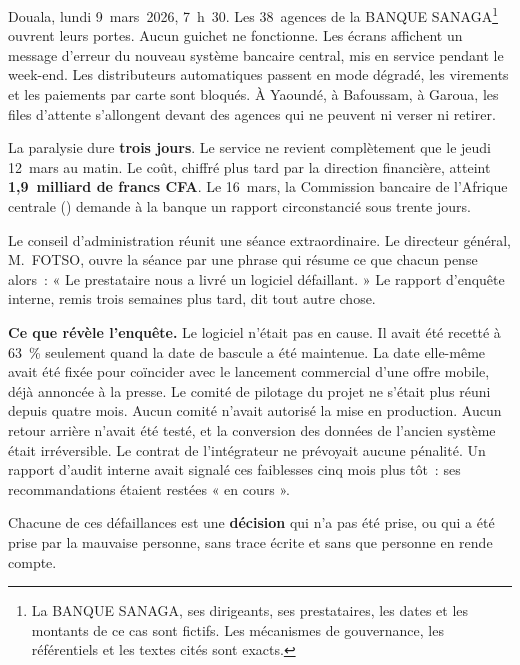 Douala, lundi 9~mars~2026, 7~h~30. Les 38~agences de la BANQUE
SANAGA\footnote{La BANQUE SANAGA, ses dirigeants, ses prestataires, les
dates et les montants de ce cas sont fictifs. Les mécanismes de
gouvernance, les référentiels et les textes cités sont exacts.} ouvrent
leurs portes. Aucun guichet ne fonctionne. Les écrans affichent un message
d'erreur du nouveau système bancaire central, mis en service pendant le
week-end. Les distributeurs automatiques passent en mode dégradé, les
virements et les paiements par carte sont bloqués. À Yaoundé, à Bafoussam,
à Garoua, les files d'attente s'allongent devant des agences qui ne peuvent
ni verser ni retirer.

La paralysie dure \textbf{trois jours}. Le service ne revient complètement
que le jeudi 12~mars au matin. Le coût, chiffré plus tard par la direction
financière, atteint \textbf{1,9~milliard de francs CFA}. Le 16~mars, la
Commission bancaire de l'Afrique centrale () demande à la banque
un rapport circonstancié sous trente jours.

\medskip

Le conseil d'administration réunit une séance extraordinaire. Le directeur
général, M.~FOTSO, ouvre la séance par une phrase qui résume ce que chacun
pense alors~: « Le prestataire nous a livré un logiciel défaillant. » Le
rapport d'enquête interne, remis trois semaines plus tard, dit tout autre
chose.

\begin{boxalert}
\textbf{Ce que révèle l'enquête.} Le logiciel n'était pas en cause. Il
avait été recetté à 63~\% seulement quand la date de bascule a été
maintenue. La date elle-même avait été fixée pour coïncider avec le
lancement commercial d'une offre mobile, déjà annoncée à la presse. Le
comité de pilotage du projet ne s'était plus réuni depuis quatre mois.
Aucun comité n'avait autorisé la mise en production. Aucun retour arrière
n'avait été testé, et la conversion des données de l'ancien système était
irréversible. Le contrat de l'intégrateur ne prévoyait aucune pénalité. Un
rapport d'audit interne avait signalé ces faiblesses cinq mois plus tôt~:
ses recommandations étaient restées « en cours ».

\smallskip
Chacune de ces défaillances est une \textbf{décision} qui n'a pas été
prise, ou qui a été prise par la mauvaise personne, sans trace écrite et
sans que personne en rende compte.
\end{boxalert}

\medskip

